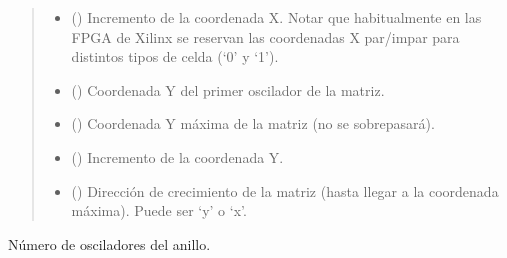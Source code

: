 \documentclass[letterpaper,10pt,english]{sphinxmanual}
\begin{document}
\begin{fulllineitems}
\begin{quote}
\begin{description}
\begin{itemize}
\item {} 
\sphinxAtStartPar
{} (\sphinxstyleliteralemphasis{\sphinxupquote{, }}) \textendash{} Incremento de la coordenada X. Notar que habitualmente en las FPGA de Xilinx se reservan las coordenadas X par/impar para distintos tipos de celda (‘0’ y ‘1’).

\item {} 
\sphinxAtStartPar
{} (\sphinxstyleliteralemphasis{\sphinxupquote{, }}) \textendash{} Coordenada Y del primer oscilador de la matriz.

\item {} 
\sphinxAtStartPar
{} (\sphinxstyleliteralemphasis{\sphinxupquote{, }}) \textendash{} Coordenada Y máxima de la matriz (no se sobrepasará).

\item {} 
\sphinxAtStartPar
{} (\sphinxstyleliteralemphasis{\sphinxupquote{, }}) \textendash{} Incremento de la coordenada Y.

\item {} 
\sphinxAtStartPar
{} (\sphinxstyleliteralemphasis{\sphinxupquote{, }}) \textendash{} Dirección de crecimiento de la matriz (hasta llegar a la coordenada
máxima). Puede ser ‘y’ o ‘x’.

\end{itemize}

\end{description}\end{quote}

\begin{fulllineitems}
\label{\detokenize{fpga.ring_osc:fpga.ring_osc.Dominio.N_osc}}
\pysigstartsignatures
{}
\pysigstopsignatures
\sphinxAtStartPar
Número de osciladores del anillo.


\end{fulllineitems}
\end{fulllineitems}
\end{document}
